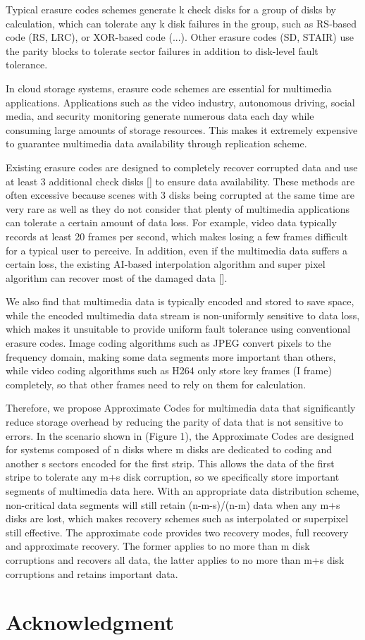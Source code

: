 \documentclass[conference]{IEEEtran}
\begin{document}
Typical erasure codes schemes generate k check disks for a group of disks by calculation, which can tolerate any k disk failures in the group, such as RS-based code (RS, LRC), or XOR-based code (...). Other erasure codes (SD, STAIR) use the parity blocks to tolerate sector failures in addition to disk-level fault tolerance.

In cloud storage systems, erasure code schemes are essential for multimedia applications. Applications such as the video industry, autonomous driving, social media, and security monitoring generate numerous data each day while consuming large amounts of storage resources. This makes it extremely expensive to guarantee multimedia data availability through replication scheme.

Existing erasure codes are designed to completely recover corrupted data and use at least 3 additional check disks [] to ensure data availability. These methods are often excessive because scenes with 3 disks being corrupted at the same time are very rare as well as they do not consider that plenty of multimedia applications can tolerate a certain amount of data loss. For example, video data typically records at least 20 frames per second, which makes losing a few frames difficult for a typical user to perceive. In addition, even if the multimedia data suffers a certain loss, the existing AI-based interpolation algorithm and super pixel algorithm can recover most of the damaged data [].

We also find that multimedia data is typically encoded and stored to save space, while the encoded multimedia data stream is non-uniformly sensitive to data loss, which makes it unsuitable to provide uniform fault tolerance using conventional erasure codes. Image coding algorithms such as JPEG convert pixels to the frequency domain, making some data segments more important than others, while video coding algorithms such as H264 only store key frames (I frame) completely, so that other frames need to rely on them for calculation.

Therefore, we propose Approximate Codes for multimedia data that significantly reduce storage overhead by reducing the parity of data that is not sensitive to errors. In the scenario shown in (Figure 1), the Approximate Codes are designed for systems composed of n disks where m disks are dedicated to coding and another s sectors encoded for the first strip. This allows the data of the first stripe to tolerate any m+s disk corruption, so we specifically store important segments of multimedia data here. With an appropriate data distribution scheme, non-critical data segments will still retain (n-m-s)/(n-m) data when any m+s disks are lost, which makes recovery schemes such as interpolated or superpixel still effective. The approximate code provides two recovery modes, full recovery and approximate recovery. The former applies to no more than m disk corruptions and recovers all data, the latter applies to no more than m+s disk corruptions and retains important data.


\section*{Acknowledgment}



\end{document}
